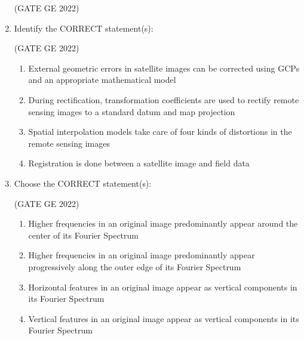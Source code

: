\documentclass[journal,12pt,onecolumn]{IEEEtran}
\theoremstyle{remark}
\begin{document}
\begin{enumerate}
\hfill (GATE GE 2022)

\begin{enumerate}
\end{enumerate}

\item Identify the CORRECT statement(s):

\hfill (GATE GE 2022)

\begin{enumerate}
    \item External geometric errors in satellite images can be corrected using GCPs and an appropriate mathematical model
    \item During rectification, transformation coefficients are used to rectify remote sensing images to a standard datum and map projection
    \item Spatial interpolation models take care of four kinds of distortions in the remote sensing images
    \item Registration is done between a satellite image and field data
\end{enumerate}

\item Choose the CORRECT statement(s):

\hfill (GATE GE 2022)

\begin{enumerate}
    \item Higher frequencies in an original image predominantly appear around the center of its Fourier Spectrum
    \item Higher frequencies in an original image predominantly appear progressively along the outer edge of its Fourier Spectrum
    \item Horizontal features in an original image appear as vertical components in its Fourier Spectrum
    \item Vertical features in an original image appear as vertical components in its Fourier Spectrum
\end{enumerate}


\end{enumerate}
\end{document}
